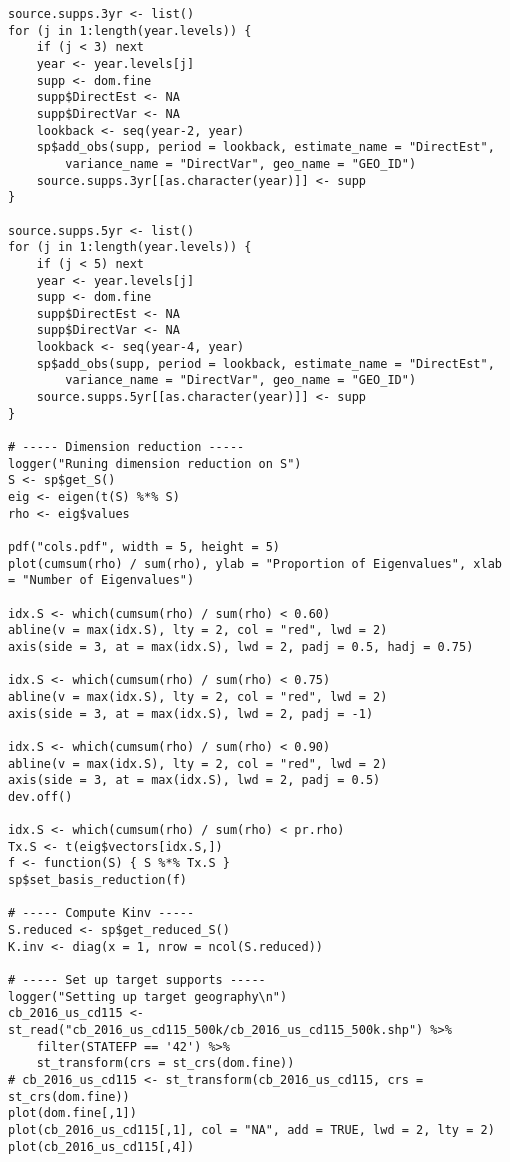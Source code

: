 \documentclass[12pt]{article}
\begin{document}
\begin{scriptsize}
\begin{verbatim}
source.supps.3yr <- list()
for (j in 1:length(year.levels)) {
	if (j < 3) next
	year <- year.levels[j]
	supp <- dom.fine
	supp$DirectEst <- NA
	supp$DirectVar <- NA
	lookback <- seq(year-2, year)
	sp$add_obs(supp, period = lookback, estimate_name = "DirectEst",
		variance_name = "DirectVar", geo_name = "GEO_ID")
	source.supps.3yr[[as.character(year)]] <- supp
}

source.supps.5yr <- list()
for (j in 1:length(year.levels)) {
	if (j < 5) next
	year <- year.levels[j]
	supp <- dom.fine
	supp$DirectEst <- NA
	supp$DirectVar <- NA
	lookback <- seq(year-4, year)
	sp$add_obs(supp, period = lookback, estimate_name = "DirectEst",
		variance_name = "DirectVar", geo_name = "GEO_ID")
	source.supps.5yr[[as.character(year)]] <- supp
}

# ----- Dimension reduction -----
logger("Runing dimension reduction on S")
S <- sp$get_S()
eig <- eigen(t(S) %*% S)
rho <- eig$values

pdf("cols.pdf", width = 5, height = 5)
plot(cumsum(rho) / sum(rho), ylab = "Proportion of Eigenvalues", xlab = "Number of Eigenvalues")

idx.S <- which(cumsum(rho) / sum(rho) < 0.60)
abline(v = max(idx.S), lty = 2, col = "red", lwd = 2)
axis(side = 3, at = max(idx.S), lwd = 2, padj = 0.5, hadj = 0.75)

idx.S <- which(cumsum(rho) / sum(rho) < 0.75)
abline(v = max(idx.S), lty = 2, col = "red", lwd = 2)
axis(side = 3, at = max(idx.S), lwd = 2, padj = -1)

idx.S <- which(cumsum(rho) / sum(rho) < 0.90)
abline(v = max(idx.S), lty = 2, col = "red", lwd = 2)
axis(side = 3, at = max(idx.S), lwd = 2, padj = 0.5)
dev.off()

idx.S <- which(cumsum(rho) / sum(rho) < pr.rho)
Tx.S <- t(eig$vectors[idx.S,])
f <- function(S) { S %*% Tx.S }
sp$set_basis_reduction(f)

# ----- Compute Kinv -----
S.reduced <- sp$get_reduced_S()
K.inv <- diag(x = 1, nrow = ncol(S.reduced))

# ----- Set up target supports -----
logger("Setting up target geography\n")
cb_2016_us_cd115 <- st_read("cb_2016_us_cd115_500k/cb_2016_us_cd115_500k.shp") %>%
	filter(STATEFP == '42') %>%
	st_transform(crs = st_crs(dom.fine))
# cb_2016_us_cd115 <- st_transform(cb_2016_us_cd115, crs = st_crs(dom.fine))
plot(dom.fine[,1])
plot(cb_2016_us_cd115[,1], col = "NA", add = TRUE, lwd = 2, lty = 2)
plot(cb_2016_us_cd115[,4])


\end{verbatim}
\end{scriptsize}
\end{document}
